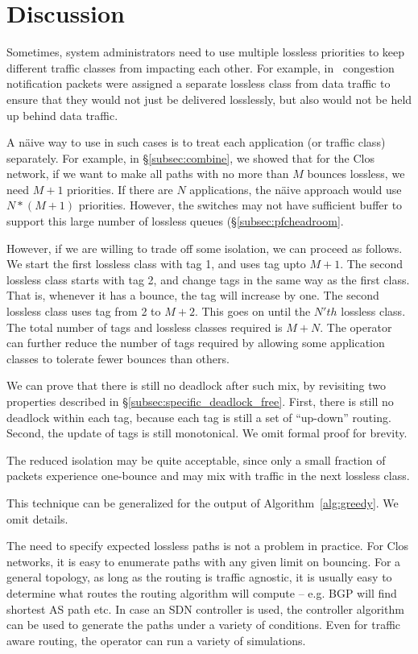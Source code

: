 \section{Discussion}

 Sometimes, system administrators need to
use multiple lossless priorities to keep different traffic classes from impacting each
other. For example, in~\cite{dcqcn} congestion notification packets were
assigned a separate lossless class from data traffic to ensure that they would
not just be delivered losslessly, but also would not be held up behind data
traffic.

A n{\"a}ive way to use \sysname{} in such cases is to treat each application (or
traffic class) separately.  For example, in \S\ref{subsec:combine}, we showed
that for the Clos network, if we want to make  all paths with no more than $M$
bounces lossless, we need $M+1$ priorities. If there are $N$ applications, the
n{\"a}ive approach would use $N*(M+1)$ priorities.  However, the switches may
not have sufficient buffer to support this large number of lossless queues
(\S\ref{subsec:pfcheadroom}.

However, if we are willing to trade off some isolation, we can proceed as
follows.  We start the first lossless class with tag 1, and uses tag upto $M+1$.
The second lossless class starts with tag 2, and change tags in the same way as
the first class.  That is, whenever it has a bounce, the tag will increase by
one. The second lossless class uses tag from 2 to $M+2$. This goes on until the
$N'th$ lossless class. The total number of tags and lossless classes required is
$M + N$. The operator can further reduce the number of tags required by allowing
some application classes to tolerate fewer bounces than others.

We can prove that there is still no deadlock after such mix, by revisiting two
properties described in \S\ref{subsec:specific_deadlock_free}. First, there is
still no deadlock within each tag, because each tag is still a set of
``up-down'' routing. Second, the update of tags is still monotonical. We omit
formal proof for brevity. 

The reduced isolation may be quite acceptable, since only a small
fraction of packets experience one-bounce and may mix with traffic in the next
lossless class. 

This technique can be generalized for the output of Algorithm~\ref{alg:greedy}.
We omit details.

 The need to specify expected
lossless paths is not a problem in practice. For Clos networks, it is easy to
enumerate paths with any given limit on bouncing. For a general topology, as long
as the routing is traffic agnostic, it is usually easy to determine what routes
the routing algorithm will compute -- e.g. BGP will find shortest AS path etc.
In case an SDN controller is used, the controller algorithm can be used to
generate the paths under a variety of conditions. Even for traffic aware
routing, the operator can run a variety of simulations. 

